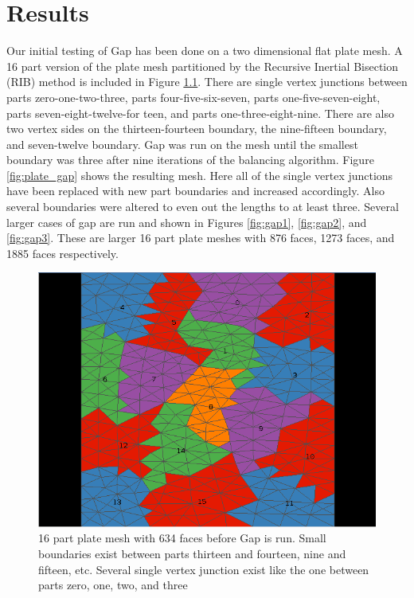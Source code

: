 \documentclass{thesis}
\begin{document}
\chapter{Results}

Our initial testing of Gap has been done on a two dimensional flat plate mesh. 
A 16 part version of the plate mesh partitioned by  the Recursive Inertial 
Bisection (RIB) method \cite{williamsRIB,taylorRIB} is included in Figure 
\ref{fig:plate}. There are single vertex junctions between parts 
zero-one-two-three, 
parts four-five-six-seven, parts one-five-seven-eight, parts 
seven-eight-twelve-for teen, and parts one-three-eight-nine. There are 
also two vertex sides on the thirteen-fourteen boundary, the nine-fifteen 
boundary, and seven-twelve 
boundary. Gap was run on the mesh until the smallest boundary was three after 
nine 
iterations of the balancing algorithm. Figure \ref{fig:plate_gap} shows the 
resulting mesh. Here all of the single vertex junctions have been replaced with 
new part boundaries and increased accordingly. Also several boundaries were 
altered to even out the lengths to at least three. Several larger cases of gap are run and shown in Figures \ref{fig:gap1}, \ref{fig:gap2}, and \ref{fig:gap3}. These are larger 16 part plate meshes with 876 faces, 1273 faces, and 1885 faces respectively.  

\begin{figure} [!hb]
\centering
\captionsetup{justification=centering,margin=1cm}
\includegraphics[width=.6\textwidth]{results_before.png}
\caption{\label{fig:plate} \textnormal{16 part plate mesh with 634 faces before Gap is run. Small boundaries exist between parts thirteen and fourteen, nine and fifteen, etc. Several single vertex junction exist like the one between parts zero, one, two, and three}}
\end{figure}
\end{document}
